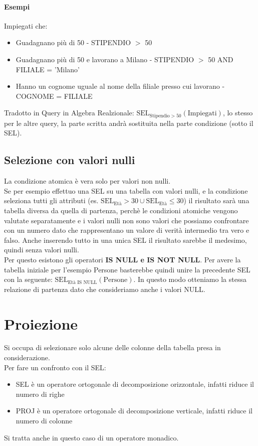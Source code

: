 \paragraph*{Esempi} Impiegati che:
\begin{itemize}
    \item Guadagnano più di 50 - STIPENDIO $>$ 50
    \item Guadagnano più di 50 e lavorano a Milano - STIPENDIO $>$ 50 AND FILIALE = 'Milano'
    \item Hanno un cognome uguale al nome della filiale presso cui lavorano - COGNOME = FILIALE
\end{itemize}
Tradotto in Query in Algebra Realzionale: $\text{SEL}_{\text{Stipendio} > 50}(\text{Impiegati})$,
lo stesso per le altre query, la parte scritta andrà sostituita nella parte condizione (sotto il SEL).
\subsection*{Selezione con valori nulli}
La condizione atomica è vera solo per valori non nulli.\\
Se per esempio effettuo una SEL su una tabella con valori nulli, e la condizione seleziona
tutti gli attributi (es. $\text{SEL}_\text{Età}>30 \cup \text{SEL}_\text{Età}\leq30$) 
il risultato sarà una tabella diversa da quella di partenza, perchè le condizioni atomiche
vengono valutate separatamente e i valori nulli non sono valori che possiamo confrontare con un numero
dato che rappresentano un valore di verità intermedio tra vero e falso. Anche inserendo tutto in una
unica SEL il risultato sarebbe il medesimo, quindi senza valori nulli. \\
Per questo esistono gli operatori \textbf{IS NULL e IS NOT NULL}. Per avere la tabella iniziale
per l'esempio Persone basterebbe quindi unire la precedente SEL con la seguente: 
$\text{SEL}_\text{Età IS NULL}(\text{Persone})$. In questo modo otteniamo la
stessa relazione di partenza dato che consideriamo anche i valori NULL.

\section{Proiezione}
Si occupa di selezionare solo alcune delle colonne della tabella presa in considerazione. \\
Per fare un confronto con il SEL:
\begin{itemize}
    \item SEL è un operatore ortogonale di decomposizione orizzontale, infatti
    riduce il numero di righe
    \item PROJ è un operatore ortogonale di decomposizione verticale, infatti
    riduce il numero di colonne
\end{itemize}
Si tratta anche in questo caso di un operatore monadico.

